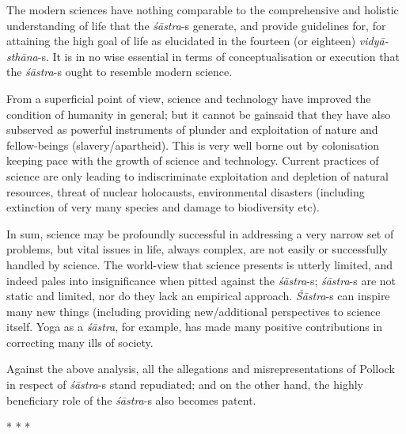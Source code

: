 The modern sciences have nothing comparable to the comprehensive and holistic understanding of life that the \textit{śāstra}-s generate, and provide guidelines for, for attaining the high goal of life as elucidated in the fourteen (or eighteen) \textit{vidyā-sthāna}-s. It is in no wise essential in terms of conceptualisation or execution that the \textit{śāstra}-s ought to resemble modern science.

From a superficial point of view, science and technology have improved the condition of humanity in general; but it cannot be gainsaid that they have also subserved as powerful instruments of plunder and exploitation of nature and fellow-beings (slavery/apartheid). This is very well borne out by colonisation keeping pace with the growth of science and technology. Current practices of science are only leading to indiscriminate exploitation and depletion of natural resources, threat of nuclear holocausts, environmental disasters (including extinction of very many species and damage to biodiversity etc).

In sum, science may be profoundly successful in addressing a very narrow set of problems, but vital issues in life, always complex, are not easily or successfully handled by science. The world-view that science presents is utterly limited, and indeed pales into insignificance when pitted against the \textit{śāstra}-s; \textit{śāstra}-s are not static and limited, nor do they lack an empirical approach. \textit{Śāstra}-s can inspire many new things (including providing new/additional perspectives to science itself. Yoga as a \textit{śāstra}, for example, has made many positive contributions in correcting many ills of society.

Against the above analysis, all the allegations and misrepresentations of Pollock in respect of \textit{śāstra}-s stand repudiated; and on the other hand, the highly beneficiary role of the \textit{śāstra}-s also becomes patent.

\begin{center}
* * *
\end{center}

\vskip -7pt

